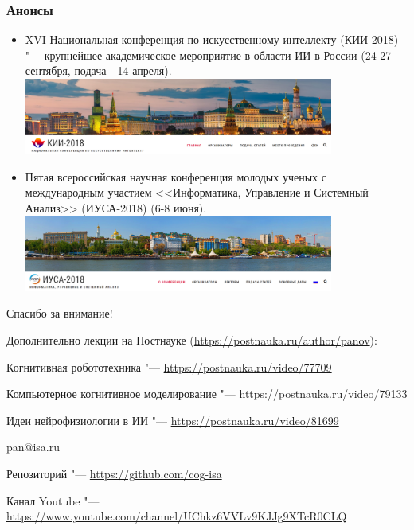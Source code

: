 \documentclass[default]{beamer}
\begin{document}
	\begin{frame}
		\frametitle{Анонсы}
		\small
		\begin{itemize}
			\item XVI Национальная конференция по искусственному интеллекту (КИИ 2018) "--- крупнейшее академическое мероприятие в области ИИ в России (24-27 сентября, подача - 14 апреля).
			\includegraphics[width=0.8\textwidth]{rncai.png}
			\item Пятая всероссийская научная конференция молодых ученых с международным участием <<Информатика, Управление и Системный Анализ>> (ИУСА-2018) (6-8 июня).
			\includegraphics[width=0.8\textwidth]{icsa.png}
		\end{itemize}
	\end{frame}
	
	\begin{frame}
		\centering
		\Huge
		Спасибо за внимание!
		\normalsize
		\par\bigskip
		Дополнительно лекции на Постнауке (\url{https://postnauka.ru/author/panov}):
		\par\medskip
		{\footnotesize
		Когнитивная робототехника "--- \url{https://postnauka.ru/video/77709}
		
		Компьютерное когнитивное моделирование "--- \url{https://postnauka.ru/video/79133}
		
		Идеи нейрофизиологии в ИИ "--- \url{https://postnauka.ru/video/81699}
		}
		\par\bigskip
		pan@isa.ru
		\par\bigskip
		Репозиторий "--- \url{https://github.com/cog-isa}
		
		Канал Youtube "--- \url{https://www.youtube.com/channel/UChkz6VVLv9KJJg9XTcR0CLQ}
	\end{frame}	
\end{document}

